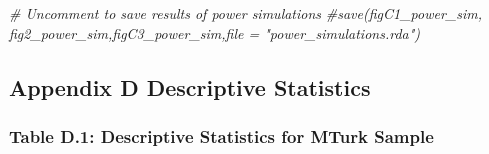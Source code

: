 \documentclass[
]{article}
\newenvironment{Shaded}{\begin{snugshade}}{\end{snugshade}}
\newcommand{\CommentTok}[1]{\textcolor[rgb]{0.56,0.35,0.01}{\textit{#1}}}
\begin{document}
\begin{Shaded}
\begin{Highlighting}[]
\CommentTok{\# Uncomment to save results of power simulations}
\CommentTok{\#save(figC1\_power\_sim, fig2\_power\_sim,figC3\_power\_sim,file = "power\_simulations.rda")}
\end{Highlighting}
\end{Shaded}

\hypertarget{appendix-d-descriptive-statistics}{%
\subsection{Appendix D Descriptive
Statistics}\label{appendix-d-descriptive-statistics}}

\setcounter{table}{0}
\renewcommand{\thetable}{D.\arabic{table}}
\setcounter{figure}{0}
\renewcommand{\thefigure}{D.\arabic{figure}}

\hypertarget{table-d.1-descriptive-statistics-for-mturk-sample}{%
\subsubsection{Table D.1: Descriptive Statistics for MTurk
Sample}\label{table-d.1-descriptive-statistics-for-mturk-sample}}
\end{document}
